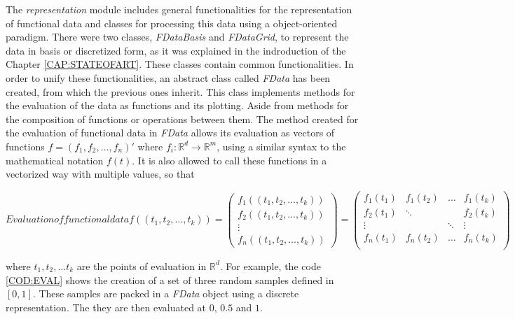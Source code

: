 The \textit{representation} module includes general functionalities for the
representation of functional data and classes for processing this data using a
object-oriented paradigm.
There were two classes, \textit{FDataBasis}
and \textit{FDataGrid}, to represent the data in basis or discretized form, as it was explained in the indroduction of the Chapter \ref{CAP:STATEOFART}.
These classes contain common functionalities.
In order to unify these functionalities, an abstract class called \textit{FData}
has been created, from which the previous ones inherit. This class implements methods for the
evaluation of the data as functions and its plotting.
Aside from methods for the composition of functions or operations between them.
The method created for the evaluation of functional data in \textit{FData}
allows its evaluation
as vectors of functions $f = (f_1, f_2, \dots, f_n)'$ where
$f_i:\mathbb{R}^d\rightarrow\mathbb{R}^m$, using a similar syntax to the mathematical
notation $f(t)$. It is also allowed to call these functions in a vectorized way with multiple values, so that

\begin{equation}[]{Evaluation of functional data}
f((t_1, t_2, \dots, t_k)) =
\begin{pmatrix}
    f_1((t_1, t_2, \dots, t_k))\\
    f_2((t_1, t_2, \dots, t_k))\\
    \vdots\\
    f_n((t_1, t_2, \dots, t_k))
  \end{pmatrix}
=
\begin{pmatrix}
f_1(t_1) & f_1(t_2) & \dots & f_1(t_k) \\
f_2(t_1) & \ddots &  & f_2(t_k) \\
\vdots &  & \ddots & \vdots \\
f_n(t_1) & f_n(t_2) & \dots & f_n(t_k) \\
\end{pmatrix}
\end{equation}

where $t_1, t_2, \dots t_k$ are the points of evaluation in $\mathbb{R}^d$.
For example, the code \ref{COD:EVAL} shows the creation of a set of three random samples
defined in $[0, 1]$. These samples are packed in a \textit{FData} object
using a discrete representation. The they are then evaluated at $0$, $0.5$ and $1$.

